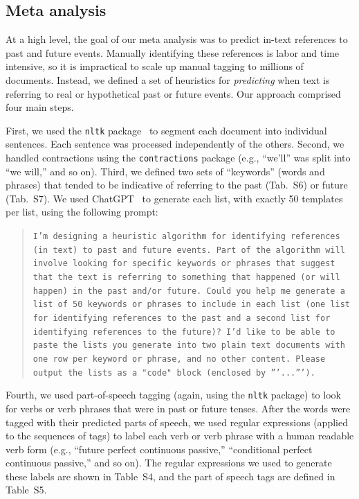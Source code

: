 \documentclass[10pt]{article}
\newcommand{\regExpTable}{S4}
\newcommand{\posTags}{S5}
\newcommand{\pastKeys}{S6}
\newcommand{\futureKeys}{S7}
\begin{document}
\subsection*{Meta analysis}

At a high level, the goal of our meta analysis was to predict in-text references to past and future events. Manually identifying these references is labor and time intensive, so it is impractical to scale up manual tagging to millions of documents. Instead, we defined a set of heuristics for \textit{predicting} when text is referring to real or hypothetical past or future events. Our approach comprised four main steps.

First, we used the \texttt{nltk} package~\citep{BirdEtal09} to segment each document into individual sentences. Each sentence was processed independently of the others. Second, we handled contractions using the \texttt{contractions} package (e.g., ``we'll'' was split into ``we will,'' and so on).  Third, we defined two sets of ``keywords'' (words and phrases) that tended to be indicative of referring to the past (Tab.~\pastKeys) or future (Tab.~\futureKeys). We used ChatGPT~\citep{ChatGPT} to generate each list, with exactly 50 templates per list, using the following prompt:

\begin{quote}
\texttt{I'm designing a heuristic algorithm for identifying references (in text) to past and future events. Part of the algorithm will involve looking for specific keywords or phrases that suggest that the text is referring to something that happened (or will happen) in the past and/or future. Could you help me generate a list of 50 keywords or phrases to include in each list (one list for identifying references to the past and a second list for identifying references to the future)? I'd like to be able to paste the lists you generate into two plain text documents with one row per keyword or phrase, and no other content. Please output the lists as a "code" block (enclosed by '''...''').}
\end{quote}
Fourth, we used part-of-speech tagging (again, using the \texttt{nltk} package) to look for verbs or verb phrases that were in past or future tenses.  After the words were tagged with their predicted parts of speech, we used regular expressions (applied to the sequences of tags) to label each verb or verb phrase with a human readable verb form (e.g., ``future perfect continuous passive,'' ``conditional perfect continuous passive,'' and so on).  The regular expressions we used to generate these labels are shown in Table~\regExpTable, and the part of speech tags are defined in Table~\posTags.
\end{document}
